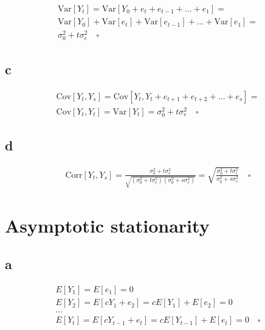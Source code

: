 \documentclass[]{book}
\begin{document}
\begin{gather*}
  \text{Var}[Y_t] = \text{Var}[Y_0 + e_t + e_{t-1} + \dots + e_1] = \\
  \text{Var}[Y_0] + \text{Var}[e_t] + \text{Var}[e_{t-1}] + \dots + \text{Var}[e_1] = \\
  \sigma_0^2+t\sigma_e^2 \quad \square
\end{gather*}

\subsection*{c}\label{c-9}

\begin{gather*}
  \text{Cov}[Y_t, Y_s] = \text{Cov}[Y_t, Y_t+e_{t+1}+e_{t+2}+ \dots + e_s] = \\
  \text{Cov}[Y_t, Y_t] = \text{Var}[Y_t] = \sigma_0^2+t\sigma_e^2 \quad \square
\end{gather*}

\subsection*{d}\label{d}

\begin{gather*}
  \text{Corr}[Y_t, Y_s] = \frac{\sigma_0^2+t\sigma_e^2}{\sqrt{(\sigma_0^2+t\sigma_e^2)(\sigma_0^2+s\sigma_e^2)}} = 
    \sqrt{\frac{\sigma_0^2+t\sigma_e^2}{\sigma_0^2+s\sigma_e^2}} \quad \square
\end{gather*}

\section{Asymptotic stationarity}\label{asymptotic-stationarity}

\subsection*{a}\label{a-16}

\begin{gather*}
  E[Y_1] = E[e_1] = 0\\
  E[Y_2] = E[cY_{1}+e_2] = cE[Y_1] + E[e_2] = 0\\
  \dots\\
  E[Y_t] = E[cY_{t-1}+e_t] = cE[Y_{t-1}] + E[e_t] = 0\quad \square
\end{gather*}
\end{document}
